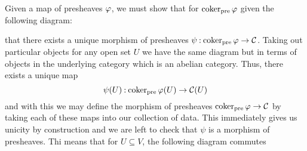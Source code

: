 \documentclass[12pt]{memoir}
\begin{document}
 \begin{ptcbr}
    Given a map of presheaves $\varphi$, we must show that for $\operatorname{coker}_{\text{pre}}\varphi$ given the following diagram:
    \begin{center}
    \end{center}
    that there exists a unique morphism of presheaves $\psi\mathbin{:}\operatorname{coker}_{\text{pre}}\varphi\to \mathcal{C}$. Taking out particular objects for any open set $U$ we have the same diagram but in terms of objects in the underlying category which is an abelian category. Thus, there exists a unique map 
    $$\psi(U)\mathbin{:}\operatorname{coker}_{\text{pre}}\varphi(U)\to\mathcal{C}(U)$$
    and with this we may define the morphism of presheaves $\operatorname{coker}_{\text{pre}}\varphi\to \mathcal{C}$ by taking each of these maps into our collection of data. This immediately gives us unicity by construction and we are left to check that $\psi$ is a morphism of presheaves. Thi means that for $U\subseteq V$, the following diagram commutes
    \begin{center}
    \end{center}
 \end{ptcbr}
\end{document}
